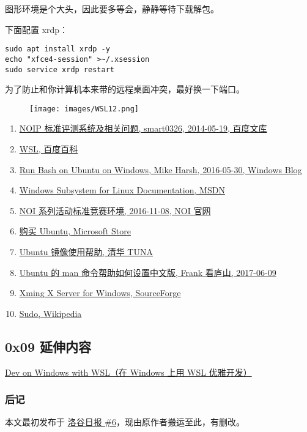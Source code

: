 图形环境是个大头，因此要多等会，静静等待下载解包。

下面配置 xrdp：

\begin{verbatim}
sudo apt install xrdp -y
echo "xfce4-session" >~/.xsession
sudo service xrdp restart
\end{verbatim}

 为了防止和你计算机本来带的远程桌面冲突，最好换一下端口。

\begin{figure}[h]
\centering
\texttt{[image: images/WSL12.png]} 

\end{figure}



\begin{enumerate}
\item \href{https://wenku.baidu.com/view/8246d96cdd36a32d72758143.html}{NOIP 标准评测系统及相关问题, smart0326, 2014-05-19, 百度文库}         
\item \href{https://baike.baidu.com/item/wsl/20359185}{WSL, 百度百科}        
\item \href{https://blogs.windows.com/buildingapps/2016/03/30/run-bash-on-ubuntu-on-windows/#cie8WdR3uSjgR5Ru.97}{Run Bash on Ubuntu on Windows, Mike Harsh, 2016-05-30, Windows Blog}         
\item \href{https://docs.microsoft.com/zh-cn/windows/wsl/about}{Windows Subsystem for Linux Documentation, MSDN}      
\item \href{http://www.noi.cn/2016-11-08-03-42-01}{NOI 系列活动标准竞赛环境, 2016-11-08, NOI 官网}      
\item \href{https://www.microsoft.com/zh-cn/p/ubuntu/9nblggh4msv6}{购买 Ubuntu, Microsoft Store}      
\item \href{https://mirrors.tuna.tsinghua.edu.cn/help/ubuntu/}{Ubuntu 镜像使用帮助, 清华 TUNA}      
\item \href{https://blog.csdn.net/qq_14989227/article/details/72954523}{Ubuntu 的 man 命令帮助如何设置中文版, Frank 看庐山, 2017-06-09}      
\item \href{https://sourceforge.net/projects/xming/}{Xming X Server for Windows, SourceForge}       
\item \href{https://zh.wikipedia.org/wiki/Sudo}{Sudo, Wikipedia}       
\end{enumerate}

\subsection{0x09 延伸内容}

\href{https://spencerwoo.com/dowww/}{Dev on Windows with WSL（在 Windows 上用 WSL 优雅开发）}

\subsubsection{后记}

本文最初发布于 \href{https://www.luogu.org/discuss/show/48491}{洛谷日报 \#6}，现由原作者搬运至此，有删改。      
